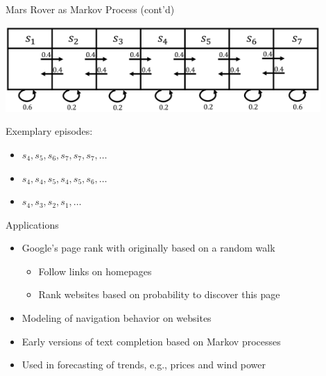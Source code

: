 \documentclass[aspectratio=169]{../latex_main/tntbeamer}  %
\begin{document}
\begin{frame}[c]{Mars Rover as Markov Process (cont'd)}
	
	\begin{center}
	\includegraphics[width=0.9\textwidth]{images/mars_rover_markov_process_2.png}
	\end{center}
	
	\bigskip
	Exemplary episodes:
	\begin{itemize}
		\item $s_4, s_5, s_6, s_7, s_7, s_7, \ldots$
		\item $s_4, s_4, s_5, s_4, s_5, s_6, \ldots$
		\item $s_4, s_3, s_2, s_1, \ldots$
	\end{itemize}
	
\end{frame}
\begin{frame}[c]{Applications}

	\begin{itemize}
		\item Google's page rank with originally based on a random walk 
		\begin{itemize}
			\item Follow links on homepages
			\item Rank websites based on probability to discover this page
		\end{itemize}
		\pause
		\smallskip
		\item Modeling of navigation behavior on websites
		\pause
		\medskip
		\item Early versions of text completion based on Markov processes
		\pause
		\medskip
		\item Used in forecasting of trends, e.g., prices and wind power
	\end{itemize}	
	
\end{frame}
\end{document}
